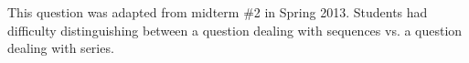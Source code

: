 \documentclass[]{ximera}
\begin{document}
\begin{instructorNotes}
This question was adapted from midterm \#2 in Spring 2013.  
Students had difficulty distinguishing between a question dealing with sequences vs. a question dealing with series.
\end{instructorNotes}







\begin{comment}
\begin{problem}

	\begin{freeResponse}
	
	\end{freeResponse}

\end{problem}

\begin{instructorNotes}

\end{instructorNotes}
\end{comment}
















	
	
	
	
	
	
	
	
	

	










								
				
				
	
\end{document}
